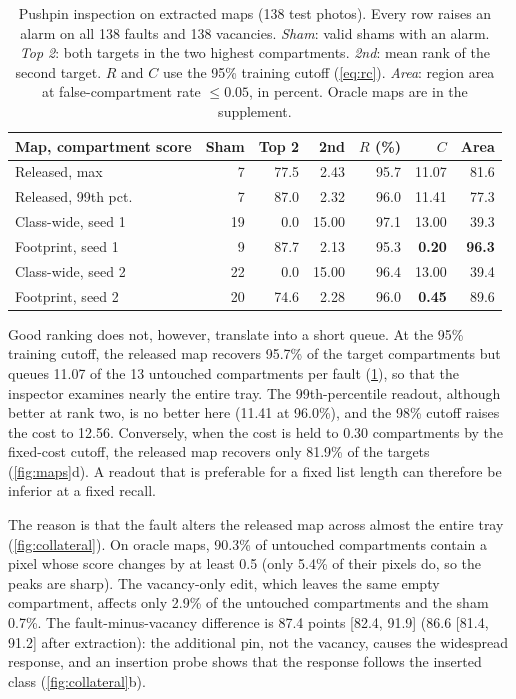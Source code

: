 \begin{table}[t]
\centering
\caption{Pushpin inspection on extracted maps (138 test photos). Every row raises an alarm on all 138 faults and 138 vacancies. \emph{Sham}: valid shams with an alarm. \emph{Top 2}: both targets in the two highest compartments. \emph{2nd}: mean rank of the second target. $R$ and $C$ use the 95\% training cutoff (\cref{eq:rc}). \emph{Area}: region area at false-compartment rate $\le0.05$, in percent. Oracle maps are in the supplement.}
\label{tab:inspection}
\footnotesize
\setlength{\tabcolsep}{3.2pt}
\begin{tabular}{@{}lrrrrrr@{}}
\toprule
Map, compartment score & Sham & Top 2 & 2nd & $R$ (\%) & $C$ & Area \\
\midrule
Released, max          & 7  & 77.5 & 2.43  & 95.7 & 11.07 & 81.6 \\
Released, 99th pct.    & 7  & 87.0 & 2.32  & 96.0 & 11.41 & 77.3 \\
\midrule
Class-wide, seed 1     & 19 & 0.0  & 15.00 & 97.1 & 13.00 & 39.3 \\
Footprint, seed 1      & 9  & 87.7 & 2.13  & 95.3 & \textbf{0.20} & \textbf{96.3} \\
\midrule
Class-wide, seed 2     & 22 & 0.0  & 15.00 & 96.4 & 13.00 & 39.4 \\
Footprint, seed 2      & 20 & 74.6 & 2.28  & 96.0 & \textbf{0.45} & 89.6 \\
\bottomrule
\end{tabular}
\end{table}

Good ranking does not, however, translate into a short queue. At the 95\% training cutoff, the released map recovers 95.7\% of the target compartments but queues 11.07 of the 13 untouched compartments per fault (\cref{tab:inspection}), so that the inspector examines nearly the entire tray. The 99th-percentile readout, although better at rank two, is no better here (11.41 at 96.0\%), and the 98\% cutoff raises the cost to 12.56. Conversely, when the cost is held to 0.30 compartments by the fixed-cost cutoff, the released map recovers only 81.9\% of the targets (\cref{fig:maps}d). A readout that is preferable for a fixed list length can therefore be inferior at a fixed recall.

The reason is that the fault alters the released map across almost the entire tray (\cref{fig:collateral}). On oracle maps, 90.3\% of untouched compartments contain a pixel whose score changes by at least 0.5 (only 5.4\% of their pixels do, so the peaks are sharp). The vacancy-only edit, which leaves the same empty compartment, affects only 2.9\% of the untouched compartments and the sham 0.7\%. The fault-minus-vacancy difference is 87.4 points [82.4, 91.9] (86.6 [81.4, 91.2] after extraction): the additional pin, not the vacancy, causes the widespread response, and an insertion probe shows that the response follows the inserted class (\cref{fig:collateral}b).


